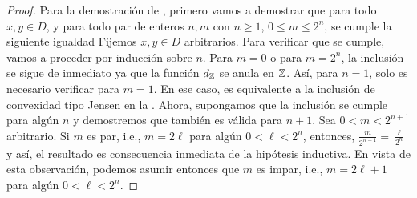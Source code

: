 \begin{proof} 
	Para la demostraci\'on de , primero vamos a demostrar que
	para todo $x,y\in D$, y para todo par de enteros $n,m$ con 
	$n\geq 1$, $0\leq m\leq 2^n$, se cumple la siguiente igualdad
	Fijemos $x,y\in D$ arbitrarios. Para verificar que  se cumple, 
	vamos a proceder por inducci\'on sobre $n$. 
	Para $m=0$ o para $m=2^n$, la inclusi\'on  se sigue de inmediato
	ya que la funci\'on $d_{\mathbb{Z}}$ se anula en $\mathbb{Z}$. As\'i, para $n=1$, solo es necesario
	verificar  para $m=1$. En ese caso,  es equivalente
	a la inclusi\'on de convexidad tipo Jensen en la .
	Ahora, supongamos que la inclusi\'on  se cumple para alg\'un $n$
	y demostremos que tambi\'en es v\'alida para $n+1$. Sea $0<m<2^{n+1}$
	arbitrario. Si $m$ es par, i.e., $m=2\ell$ para alg\'un $0<\ell<2^n$,
	entonces, $\frac{m}{2^{n+1}}=\frac{\ell}{2^n}$ y as\'i, el resultado
	es consecuencia inmediata de la hip\'otesis inductiva. En vista de
	esta observaci\'on, podemos asumir entonces que $m$ es impar, i.e., 
	$m = 2\ell + 1$ para alg\'un $0 < \ell < 2^n$.
	

\end{proof}
